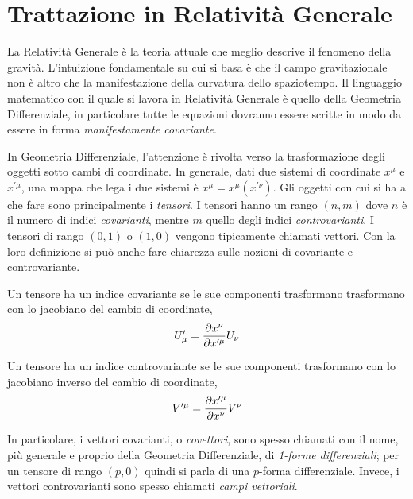 \chapter{Trattazione in Relatività Generale}
La Relatività Generale è la teoria attuale che meglio descrive il fenomeno della gravità. L'intuizione fondamentale su cui si basa è che il campo gravitazionale non è altro che la manifestazione della curvatura dello spaziotempo. Il linguaggio matematico con il quale si lavora in Relatività Generale è quello della Geometria Differenziale, in particolare tutte le equazioni dovranno essere scritte in modo da essere in forma \emph{manifestamente covariante}.

In Geometria Differenziale, l'attenzione è rivolta verso la trasformazione degli oggetti sotto cambi di coordinate. In generale, dati due sistemi di coordinate $x^\mu$ e $x^{\prime\mu}$, una mappa che lega i due sistemi è $x^\mu = x^\mu(x^{\prime\nu})$. Gli oggetti con cui si ha a che fare sono principalmente i \emph{tensori}. I tensori hanno un rango $(n,m)$ dove $n$ è il numero di indici \emph{covarianti}, mentre $m$ quello degli indici \emph{controvarianti}. I tensori di rango $(0,1)$ o $(1,0)$ vengono tipicamente chiamati vettori. Con la loro definizione si può anche fare chiarezza sulle nozioni di covariante e controvariante. 
\begin{defn}
    Un tensore ha un indice covariante se le sue componenti trasformano trasformano con lo jacobiano del cambio di coordinate,
    \begin{equation}
        U_\mu^\prime = \frac{\partial x^\nu}{\partial x^{\prime\mu}}U_\nu
    \end{equation}
\end{defn}
\begin{defn}
    Un tensore ha un indice controvariante se le sue componenti trasformano con lo jacobiano inverso del cambio di coordinate,
    \begin{equation}
        V^{\prime\mu} = \frac{\partial x^{\prime\mu}}{\partial x^{\nu}}V^\nu
    \end{equation}
\end{defn}
In particolare, i vettori covarianti, o \emph{covettori}, sono spesso chiamati con il nome, più generale e proprio della Geometria Differenziale, di \emph{1-forme differenziali}; per un tensore di rango $(p,0)$ quindi si parla di una $p$-forma differenziale. Invece, i vettori controvarianti sono spesso chiamati \emph{campi vettoriali}.

